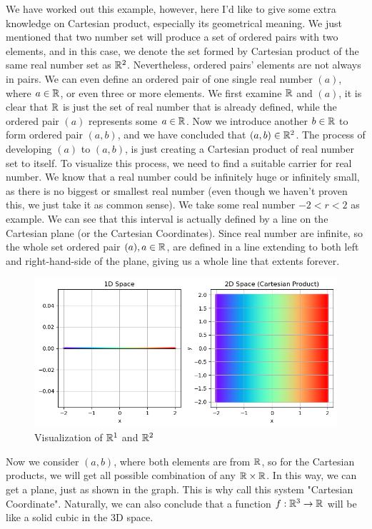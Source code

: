 	    
		We have worked out this example, however, here I'd like to give some extra knowledge on Cartesian product, especially its geometrical meaning. We just mentioned that two number set 
		will produce a set of ordered pairs with two elements, and in this case, we denote the set formed by Cartesian product of the same real number set as $\mathbb{R}^2$. Nevertheless, ordered pairs'
		elements are not always in pairs. We can even define an ordered pair of one single real number $(a)$, where $a \in \mathbb{R}$, or even three or more elements. We first examine $\mathbb{R}$ and $(a)$, 
		it is clear that $\mathbb{R}$ is just the set of real number that is already defined, while the ordered pair $(a)$ represents some $a\in \mathbb{R}$. Now we introduce another $b\in \mathbb{R}$ to
		form ordered pair $(a,b)$, and we have concluded that $(a,b) \in \mathbb{R}^2$. The process of developing $(a)$ to $(a,b)$,  is just creating a Cartesian product of real number set 
		to itself. To visualize this process, we need to find a suitable carrier for real number. We know that a real number could be infinitely huge or infinitely small, as there is no
		biggest or smallest real number (even though we haven't proven this, we just take it as common sense). We take some real number $-2 <r < 2$ as example. We can see that this interval is
		actually defined by a line on the Cartesian plane (or the Cartesian Coordinates). Since real number are infinite, so the whole set ordered pair $(a), a\in \mathbb{R}$, are defined in a line
		extending to both left and right-hand-side of the plane, giving us a whole line that extents forever.
		\begin{figure}[H]
			\centering
			\includegraphics[width=0.8\linewidth]{Images/R^2}
			\caption{Visualization of $\mathbb{R}^1$ and $\mathbb{R}^2$}
			\label{fig:r2}
		\end{figure}
		Now we consider $(a,b)$, where both elements are from $\mathbb{R}$, so for the Cartesian products, we will get all possible combination of any $\mathbb{R}\times \mathbb{R}$. In this way, we can get a plane, just as
		shown in the graph. This is why call this system "Cartesian Coordinate". Naturally, we can also conclude that a function $f: \mathbb{R}^3 \to \mathbb{R}$ will be like a solid cubic in the 3D space.

